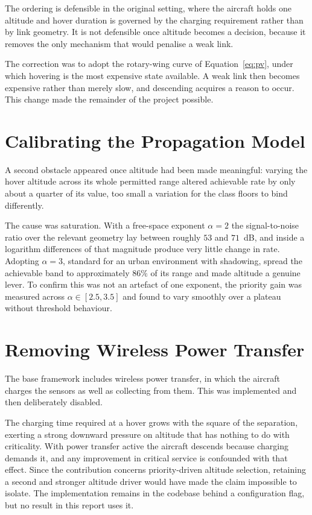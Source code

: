 The ordering is defensible in the original setting, where the aircraft holds one altitude and hover duration is governed by the charging requirement rather than by link geometry. It is not defensible once altitude becomes a decision, because it removes the only mechanism that would penalise a weak link.

The correction was to adopt the rotary-wing curve of Equation~\eqref{eq:pv}, under which hovering is the most expensive state available. A weak link then becomes expensive rather than merely slow, and descending acquires a reason to occur. This change made the remainder of the project possible.

\section{Calibrating the Propagation Model}
\label{sec:tasks_alpha}

A second obstacle appeared once altitude had been made meaningful: varying the hover altitude across its whole permitted range altered achievable rate by only about a quarter of its value, too small a variation for the class floors to bind differently.

The cause was saturation. With a free-space exponent $\alpha = 2$ the signal-to-noise ratio over the relevant geometry lay between roughly $53$ and $71$~dB, and inside a logarithm differences of that magnitude produce very little change in rate. Adopting $\alpha = 3$, standard for an urban environment with shadowing, spread the achievable band to approximately $86\%$ of its range and made altitude a genuine lever. To confirm this was not an artefact of one exponent, the priority gain was measured across $\alpha \in [2.5, 3.5]$ and found to vary smoothly over a plateau without threshold behaviour.

\section{Removing Wireless Power Transfer}
\label{sec:tasks_wpt}

The base framework includes wireless power transfer, in which the aircraft charges the sensors as well as collecting from them. This was implemented and then deliberately disabled.

The charging time required at a hover grows with the square of the separation, exerting a strong downward pressure on altitude that has nothing to do with criticality. With power transfer active the aircraft descends because charging demands it, and any improvement in critical service is confounded with that effect. Since the contribution concerns priority-driven altitude selection, retaining a second and stronger altitude driver would have made the claim impossible to isolate. The implementation remains in the codebase behind a configuration flag, but no result in this report uses it.

